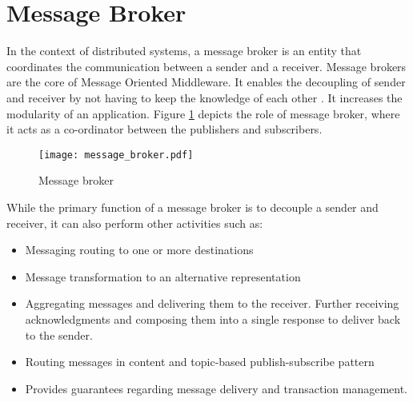\section{Message Broker}

In the context of distributed systems, a message broker is an entity that coordinates the communication between a sender and a receiver. Message brokers are the core of Message Oriented Middleware. It enables the decoupling of sender and receiver by not having to keep the knowledge of each other \parencite{message_brokers}. It increases the modularity of an application. Figure \ref{figures:message_broker} depicts the role of message broker, where it acts as a co-ordinator between the publishers and subscribers.

\makeatletter
\setlength{\intextsep}{25pt}
\makeatother

\begin{figure}[h]
\centering
\texttt{[image: message\_broker.pdf]}
\caption{Message broker}\label{figures:message_broker}
\end{figure}

While the primary function of a message broker is to decouple a sender and receiver, it can also perform other activities \parencite{message_brokers_usage} such as:

\begin{itemize}
  \item Messaging routing to one or more destinations
  \item Message transformation to an alternative representation
  \item Aggregating messages and delivering them to the receiver. Further receiving acknowledgments and composing them into a single response to deliver back to the sender.
  \item Routing messages in content and topic-based publish-subscribe pattern
  \item Provides guarantees regarding message delivery and transaction management.
\end{itemize}